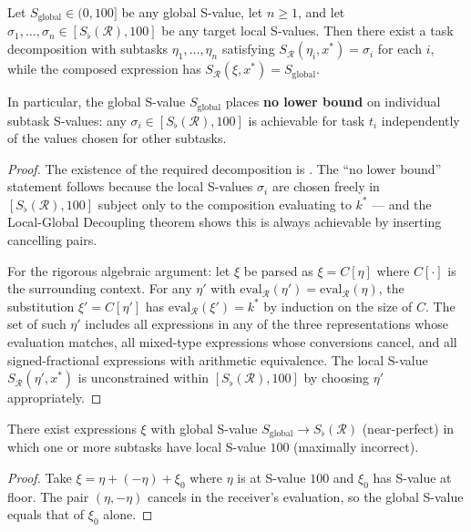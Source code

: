 \begin{theorem}
\label{thm:unconstrained-subtask}
Let $S_{\mathrm{global}} \in (0, 100]$ be any global S-value, let $n \geq 1$,
and let $\sigma_1, \ldots, \sigma_n \in [S_\flat(\mathcal{R}), 100]$ be any
target local S-values.  Then there exist a task decomposition with subtasks
$\eta_1, \ldots, \eta_n$ satisfying $S_{\mathcal{R}}(\eta_i, x^*) = \sigma_i$
for each $i$, while the composed expression has $S_{\mathcal{R}}(\xi, x^*) =
S_{\mathrm{global}}$.

In particular, the global S-value $S_{\mathrm{global}}$ places
\textbf{no lower bound} on individual subtask S-values: any $\sigma_i \in
[S_\flat(\mathcal{R}), 100]$ is achievable for task $t_i$ independently
of the values chosen for other subtasks.
\end{theorem}

\begin{proof}
The existence of the required decomposition is .  The
``no lower bound'' statement follows because the local S-values $\sigma_i$
are chosen freely in $[S_\flat(\mathcal{R}), 100]$ subject only to the
composition evaluating to $k^*$ — and the Local-Global Decoupling theorem
shows this is always achievable by inserting cancelling pairs.

For the rigorous algebraic argument: let $\xi$ be parsed as $\xi = C[\eta]$
where $C[\cdot]$ is the surrounding context.  For any $\eta'$ with
$\mathrm{eval}_{\mathcal{R}}(\eta') = \mathrm{eval}_{\mathcal{R}}(\eta)$, the
substitution $\xi' = C[\eta']$ has
$\mathrm{eval}_{\mathcal{R}}(\xi') = k^*$ by induction on the size of $C$.
The set of such $\eta'$ includes all expressions in any of the three
representations whose evaluation matches, all mixed-type expressions whose
conversions cancel, and all signed-fractional expressions with arithmetic
equivalence.  The local S-value $S_{\mathcal{R}}(\eta', x^*)$ is unconstrained
within $[S_\flat(\mathcal{R}), 100]$ by choosing $\eta'$ appropriately.
\end{proof}

\begin{corollary}
\label{cor:local-infeasibility}
There exist expressions $\xi$ with global S-value
$S_{\mathrm{global}} \to S_\flat(\mathcal{R})$ (near-perfect) in which one or
more subtasks have local S-value $100$ (maximally incorrect).
\end{corollary}

\begin{proof}
Take $\xi = \eta + (-\eta) + \xi_0$ where $\eta$ is at S-value $100$ and
$\xi_0$ has S-value at floor.  The pair $(\eta, -\eta)$ cancels in the
receiver's evaluation, so the global S-value equals that of $\xi_0$ alone.
\end{proof}

